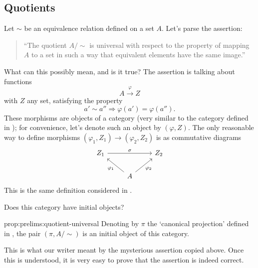 \subsection{Quotients}%
\label{subsec:prelims:quotients}
Let $\sim$ be an equivalence relation defined on a set $A$. Let's
parse the assertion:
\begin{quote}
  ``The quotient $A/{\sim}$ is universal with respect to the property
  of mapping $A$ to a set in such a way that equivalent elements have
  the same image.''
\end{quote}
What can this possibly mean, and is it true?  The assertion is talking
about functions
\[
  A \xrightarrow{\varphi} Z
\]
with $Z$ any set, satisfying the property
\[
  a' \sim a'' \Rightarrow \varphi(a') = \varphi(a'').
\]
These morphisms are objects of a category (very similar to the
category defined in ); for
convenience, let's denote such an object by $(\varphi, Z)$.  The only
reasonable way to define morphisms
$(\varphi_1, Z_1) \to (\varphi_2, Z_2)$ is as commutative diagrams
\[
  \begin{tikzcd}
    Z_1 \arrow[rr, "\sigma"] & & Z_2 \\
    & A \arrow[ul, "\varphi_1"] \arrow[ur, "\varphi_2"'] &
  \end{tikzcd}
\]
This is the same definition considered in
.

Does this category have initial objects?
\begin{prop}{}{prop:prelims:quotient-universal}
  Denoting by $\pi$ the `canonical projection' defined in
  , the pair
  $(\pi, A/{\sim})$ is an initial object of this category.
\end{prop}

This is what our writer meant by the mysterious assertion copied
above. Once this is understood, it is very easy to prove that the
assertion is indeed correct.

